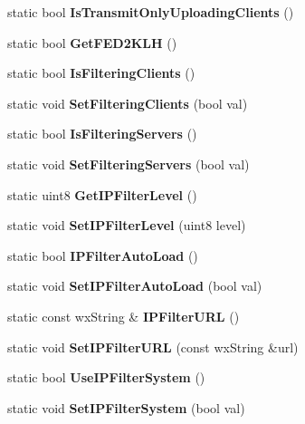 \begin{DoxyCompactItemize}
\item 
static bool {\bfseries IsTransmitOnlyUploadingClients} ()\label{classCPreferences_a80a882511c5d1f30013a98f210520930}

\item 
static bool {\bfseries GetFED2KLH} ()\label{classCPreferences_a69bb1985228cdde2e5e02395476a60ce}

\item 
static bool {\bfseries IsFilteringClients} ()\label{classCPreferences_adb068fe33a259f86dd760da450dcb349}

\item 
static void {\bfseries SetFilteringClients} (bool val)\label{classCPreferences_a53dfb8ac2c968d25a4e20af67bc6d118}

\item 
static bool {\bfseries IsFilteringServers} ()\label{classCPreferences_aa970539d2e7f3e3987d08156097c8b54}

\item 
static void {\bfseries SetFilteringServers} (bool val)\label{classCPreferences_a3da6ecb79cafe8f872e4c7b4e9ff0559}

\item 
static uint8 {\bfseries GetIPFilterLevel} ()\label{classCPreferences_aabecfddda59b5839860ed460966635c3}

\item 
static void {\bfseries SetIPFilterLevel} (uint8 level)\label{classCPreferences_afe17b4966d31fbcee4eb0851d0892217}

\item 
static bool {\bfseries IPFilterAutoLoad} ()\label{classCPreferences_ad11881f512689313b415419fb80347cc}

\item 
static void {\bfseries SetIPFilterAutoLoad} (bool val)\label{classCPreferences_a82760a5454a0e9e0751387662cc7b838}

\item 
static const wxString \& {\bfseries IPFilterURL} ()\label{classCPreferences_a64779bebc89b3632f72b2ed34ea5a1b1}

\item 
static void {\bfseries SetIPFilterURL} (const wxString \&url)\label{classCPreferences_a2219cbb41ba6e707a807444bdf0a09c6}

\item 
static bool {\bfseries UseIPFilterSystem} ()\label{classCPreferences_ae31ea84dec15134ef613b45b17b9e4d1}

\item 
static void {\bfseries SetIPFilterSystem} (bool val)\label{classCPreferences_a99f054f4531240d17ecf216f928cca1b}


\end{DoxyCompactItemize}
